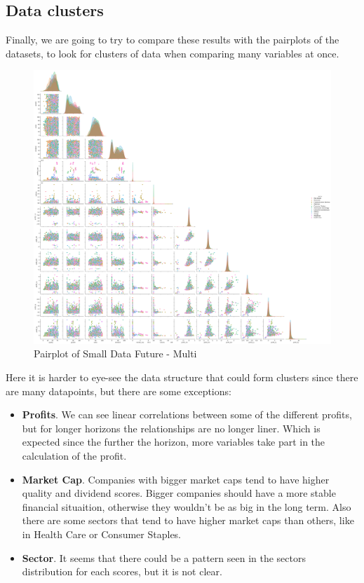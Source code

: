 \documentclass[11pt,english,a4paper,hidelinks]{book}
\begin{document}
\subsection{Data clusters}
Finally, we are going to try to compare these results with the pairplots of the datasets, to look for clusters of data when comparing many variables at once.

\begin{figure}[H]
    \centering
    \includegraphics[width=1\textwidth]{images/code/descriptive analysis/correlations/Small Data future - Multi - pairplot.png}
    \caption{Pairplot of Small Data Future - Multi}
    \label{fig:pairplot_small_data_future_multi}
\end{figure}

\noindent Here it is harder to eye-see the data structure that could form clusters since there are many datapoints, but there are some exceptions:
\begin{itemize}
    \item \textbf{Profits}. We can see linear correlations between some of the different profits, but for longer horizons the relationships are no longer liner. Which is expected since the further the horizon, more variables take part in the calculation of the profit.
    \item \textbf{Market Cap}. Companies with bigger market caps tend to have higher quality and dividend scores. Bigger companies should have a more stable financial situaition, otherwise they wouldn't be as big in the long term. Also there are some sectors that tend to have higher market caps than others, like in Health Care or Consumer Staples.
    \item \textbf{Sector}. It seems that there could be a pattern seen in the sectors distribution for each scores, but it is not clear.
\end{itemize}
\end{document}
